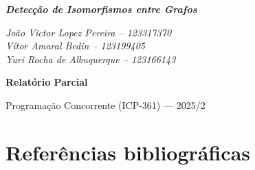 \documentclass[12pt, a4paper]{article}
\begin{document}
  \begin{center}

    {\huge \bfseries \itshape Detecção de Isomorfismos entre Grafos\par}

    \vspace{0.3cm}

    {\large \itshape João Victor Lopez Pereira -- 123317370 \\ Vítor Amaral Bedin -- 123199405\\ Yuri Rocha de Albuquerque -- 123166143\par}

    \vspace{0.4cm}

    {\large \bfseries Relatório Parcial\par}

    {\large Programação Concorrente (ICP-361) --- 2025/2\par}
  \end{center}

  

  \section{Referências bibliográficas}

    \nocite{*}
    \printbibliography[heading=none]
\end{document}
